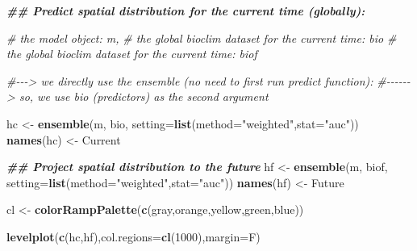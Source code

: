 \documentclass[
]{article}
\newenvironment{Shaded}{\begin{snugshade}}{\end{snugshade}}
\newcommand{\AttributeTok}[1]{\textcolor[rgb]{0.13,0.29,0.53}{#1}}
\newcommand{\CommentTok}[1]{\textcolor[rgb]{0.56,0.35,0.01}{\textit{#1}}}
\newcommand{\DecValTok}[1]{\textcolor[rgb]{0.00,0.00,0.81}{#1}}
\newcommand{\DocumentationTok}[1]{\textcolor[rgb]{0.56,0.35,0.01}{\textbf{\textit{#1}}}}
\newcommand{\FunctionTok}[1]{\textcolor[rgb]{0.13,0.29,0.53}{\textbf{#1}}}
\newcommand{\NormalTok}[1]{#1}
\newcommand{\OtherTok}[1]{\textcolor[rgb]{0.56,0.35,0.01}{#1}}
\newcommand{\StringTok}[1]{\textcolor[rgb]{0.31,0.60,0.02}{#1}}
\begin{document}
\begin{Shaded}
\begin{Highlighting}[]
\DocumentationTok{\#\# Predict spatial distribution for the current time (globally):}

\CommentTok{\# the model object: m, }
\CommentTok{\# the global bioclim dataset for the current time: bio}
\CommentTok{\# the global bioclim dataset for the current time: biof}

\CommentTok{\#{-}{-}{-}\textgreater{} we directly use the ensemble (no need to first run predict function):}
\CommentTok{\#{-}{-}{-}{-}{-}{-}\textgreater{} so, we use bio (predictors) as the second argument}

\NormalTok{hc }\OtherTok{\textless{}{-}} \FunctionTok{ensemble}\NormalTok{(m, bio, }\AttributeTok{setting=}\FunctionTok{list}\NormalTok{(}\AttributeTok{method=}\StringTok{"weighted"}\NormalTok{,}\AttributeTok{stat=}\StringTok{"auc"}\NormalTok{))}
\FunctionTok{names}\NormalTok{(hc) }\OtherTok{\textless{}{-}} \StringTok{\textquotesingle{}Current\textquotesingle{}}

\DocumentationTok{\#\# Project spatial distribution to the future}
\NormalTok{hf }\OtherTok{\textless{}{-}} \FunctionTok{ensemble}\NormalTok{(m, biof, }\AttributeTok{setting=}\FunctionTok{list}\NormalTok{(}\AttributeTok{method=}\StringTok{"weighted"}\NormalTok{,}\AttributeTok{stat=}\StringTok{"auc"}\NormalTok{))}
\FunctionTok{names}\NormalTok{(hf) }\OtherTok{\textless{}{-}} \StringTok{\textquotesingle{}Future\textquotesingle{}}

\NormalTok{cl }\OtherTok{\textless{}{-}} \FunctionTok{colorRampPalette}\NormalTok{(}\FunctionTok{c}\NormalTok{(}\StringTok{\textquotesingle{}gray\textquotesingle{}}\NormalTok{,}\StringTok{\textquotesingle{}orange\textquotesingle{}}\NormalTok{,}\StringTok{\textquotesingle{}yellow\textquotesingle{}}\NormalTok{,}\StringTok{\textquotesingle{}green\textquotesingle{}}\NormalTok{,}\StringTok{\textquotesingle{}blue\textquotesingle{}}\NormalTok{)) }


\FunctionTok{levelplot}\NormalTok{(}\FunctionTok{c}\NormalTok{(hc,hf),}\AttributeTok{col.regions=}\FunctionTok{cl}\NormalTok{(}\DecValTok{1000}\NormalTok{),}\AttributeTok{margin=}\NormalTok{F)}
\end{Highlighting}
\end{Shaded}
\end{document}
